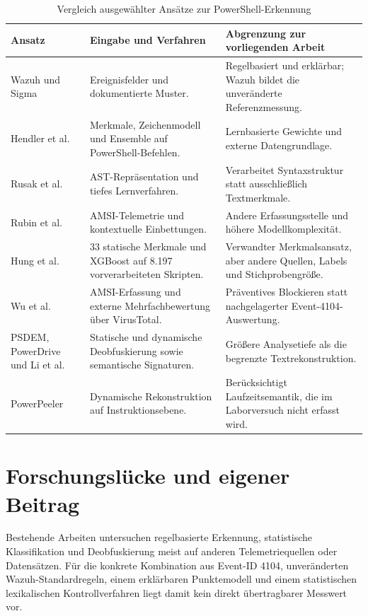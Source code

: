 \documentclass[12pt,a4paper,oneside,parskip=half]{scrreprt}
\begin{document}
\begin{table}[H]
\centering
\caption[Vergleich ausgewählter Ansätze zur PowerShell-Erkennung]{Vergleich ausgewählter Ansätze zur PowerShell-Erkennung}
\label{tab:related-work}
\small
\begin{tabularx}{\textwidth}{|L{2.8cm}|L{4.5cm}|Y|}
\hline
\textbf{Ansatz} & \textbf{Eingabe und Verfahren} & \textbf{Abgrenzung zur vorliegenden Arbeit}\\
\hline
Wazuh und Sigma \cite{wazuh-rules,sigmahq-powershell} & Ereignisfelder und dokumentierte Muster. & Regelbasiert und erklärbar; Wazuh bildet die unveränderte Referenzmessung.\\
\hline
Hendler et al. \cite{hendler2018} & Merkmale, Zeichenmodell und Ensemble auf PowerShell-Befehlen. & Lernbasierte Gewichte und externe Datengrundlage.\\
\hline
Rusak et al. \cite{rusak2018} & AST-Repräsentation und tiefes Lernverfahren. & Verarbeitet Syntaxstruktur statt ausschließlich Textmerkmale.\\
\hline
Rubin et al. \cite{rubin2020} & AMSI-Telemetrie und kontextuelle Einbettungen. & Andere Erfassungsstelle und höhere Modellkomplexität.\\
\hline
Hung et al. \cite{hung2024} & 33 statische Merkmale und XGBoost auf 8.197 vorverarbeiteten Skripten. & Verwandter Merkmalsansatz, aber andere Quellen, Labels und Stichprobengröße.\\
\hline
Wu et al. \cite{wu2024mpsd} & AMSI-Erfassung und externe Mehrfachbewertung über VirusTotal. & Präventives Blockieren statt nachgelagerter Event-4104-Auswertung.\\
\hline
PSDEM, PowerDrive und Li et al. \cite{liu2018,ugarte2019,li2019} & Statische und dynamische Deobfuskierung sowie semantische Signaturen. & Größere Analysetiefe als die begrenzte Textrekonstruktion.\\
\hline
PowerPeeler \cite{li2024powerpeeler} & Dynamische Rekonstruktion auf Instruktionsebene. & Berücksichtigt Laufzeitsemantik, die im Laborversuch nicht erfasst wird.\\
\hline
\end{tabularx}
\end{table}

\section{Forschungslücke und eigener Beitrag}
Bestehende Arbeiten untersuchen regelbasierte Erkennung, statistische Klassifikation und Deobfuskierung meist auf anderen Telemetriequellen oder Datensätzen. Für die konkrete Kombination aus Event-ID 4104, unveränderten Wazuh-Standardregeln, einem erklärbaren Punktemodell und einem statistischen lexikalischen Kontrollverfahren liegt damit kein direkt übertragbarer Messwert vor.
\end{document}
